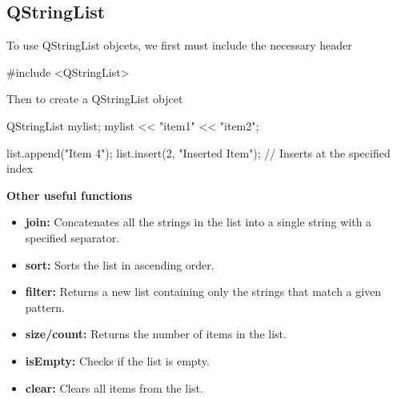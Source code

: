 \documentclass{report}
\begin{document}
    \subsection{QStringList}
    \bigbreak \noindent 
    To use QStringList objcets, we first must include the necessary header
    \bigbreak \noindent 
    \begin{cppcode}
    #include <QStringList>
    \end{cppcode}
    \bigbreak \noindent 
    Then to create a QStringList objcet
    \bigbreak \noindent 
    \begin{cppcode}
    QStringList mylist;
    mylist << "item1" << "item2";

    list.append("Item 4");
    list.insert(2, "Inserted Item");  // Inserts at the specified index
    \end{cppcode}
    \bigbreak \noindent 
    \textbf{Other useful functions}
    \begin{itemize}
        \item \textbf{join:} Concatenates all the strings in the list into a single string with a specified separator.
        \item \textbf{sort:} Sorts the list in ascending order.
        \item \textbf{filter:} Returns a new list containing only the strings that match a given pattern.
        \item \textbf{size/count:} Returns the number of items in the list.
        \item \textbf{isEmpty:} Checks if the list is empty.
        \item \textbf{clear:} Clears all items from the list.
    \end{itemize}
\end{document}
